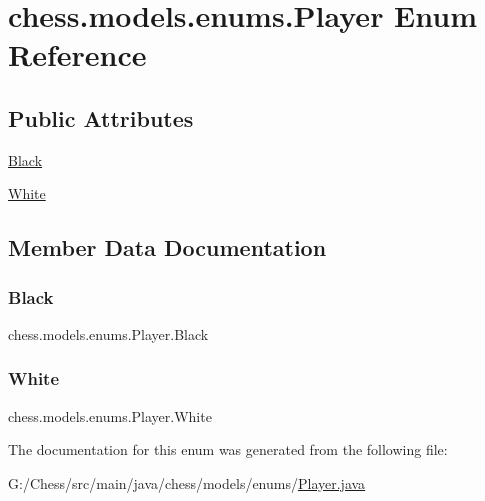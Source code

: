 \hypertarget{enumchess_1_1models_1_1enums_1_1_player}{}\section{chess.\+models.\+enums.\+Player Enum Reference}
\label{enumchess_1_1models_1_1enums_1_1_player}
\subsection*{Public Attributes}
\begin{DoxyCompactItemize}
\item 
\mbox{\hyperlink{enumchess_1_1models_1_1enums_1_1_player_a37677111d3c5ecaf7109ebe257b7d756}{Black}}
\item 
\mbox{\hyperlink{enumchess_1_1models_1_1enums_1_1_player_a60ced79fc80ec46a6a2a6f031b27b08e}{White}}
\end{DoxyCompactItemize}


\subsection{Member Data Documentation}
\mbox{\label{enumchess_1_1models_1_1enums_1_1_player_a37677111d3c5ecaf7109ebe257b7d756}} 
\subsubsection{\texorpdfstring{Black}{Black}}
{\footnotesize\ttfamily chess.\+models.\+enums.\+Player.\+Black}

\mbox{\label{enumchess_1_1models_1_1enums_1_1_player_a60ced79fc80ec46a6a2a6f031b27b08e}} 
\subsubsection{\texorpdfstring{White}{White}}
{\footnotesize\ttfamily chess.\+models.\+enums.\+Player.\+White}



The documentation for this enum was generated from the following file\+:\begin{DoxyCompactItemize}
\item 
G\+:/\+Chess/src/main/java/chess/models/enums/\mbox{\hyperlink{_player_8java}{Player.\+java}}\end{DoxyCompactItemize}
